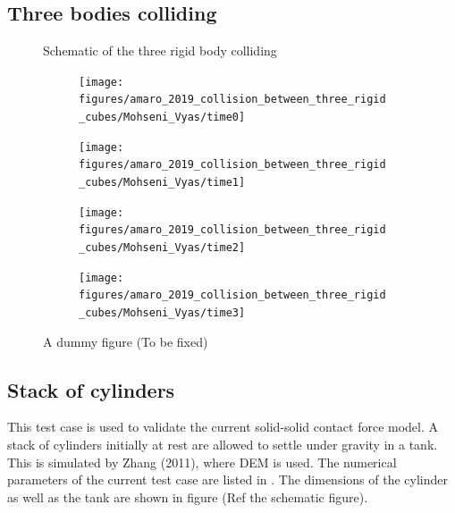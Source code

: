 \documentclass[preprint,12pt]{elsarticle}
\begin{document}
\FloatBarrier%
\subsection{Three bodies colliding}
\label{sec:three-bodies-colliding}


\begin{figure}[!htpb]
  \centering
  \caption{Schematic of the three rigid body colliding}
\label{fig:schematic-three-rigid-bodies-colliding}
\end{figure}

\begin{figure}[!htpb]
  \centering
  \begin{subfigure}{0.48\textwidth}
    \centering
    \texttt{[image: figures/amaro\_2019\_collision\_between\_three\_rigid\_cubes/Mohseni\_Vyas/time0]}
  \end{subfigure}
  \begin{subfigure}{0.48\textwidth}
    \centering
    \texttt{[image: figures/amaro\_2019\_collision\_between\_three\_rigid\_cubes/Mohseni\_Vyas/time1]}
  \end{subfigure}

  \begin{subfigure}{0.48\textwidth}
    \centering
    \texttt{[image: figures/amaro\_2019\_collision\_between\_three\_rigid\_cubes/Mohseni\_Vyas/time2]}
  \end{subfigure}
  \begin{subfigure}{0.48\textwidth}
    \centering
    \texttt{[image: figures/amaro\_2019\_collision\_between\_three\_rigid\_cubes/Mohseni\_Vyas/time3]}
  \end{subfigure}
\caption{A dummy figure (To be fixed)}
\label{fig:snapshots-three-cubes-colliding}
\end{figure}
%


\FloatBarrier%
\subsection{Stack of cylinders}
\label{sec:stack-of-cylinders}

This test case is used to validate the current solid-solid contact force
model. A stack of cylinders initially at rest are allowed to settle under
gravity in a tank. This is simulated by Zhang (2011), where DEM is used. The
numerical parameters of the current test case are listed in
. The dimensions of the cylinder as well as the
tank are shown in figure (Ref the schematic figure).
\end{document}
